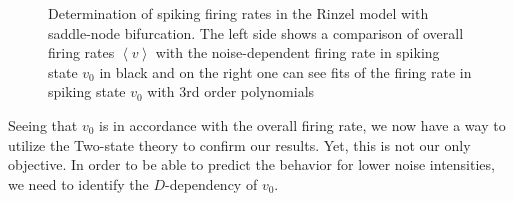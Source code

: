 \documentclass[12pt,a4paper]{article}
\begin{document}
\begin{figure}[H]
	\hspace*{-0.5cm}
	\caption{Determination of spiking firing rates in the Rinzel model with saddle-node bifurcation. The left side shows a comparison of overall firing rates $\left<v\right>$ with the noise-dependent firing rate in spiking state $v_0$ in black and on the right one can see fits of the firing rate in spiking state $v_0$ with 3rd order polynomials}
\end{figure} 
Seeing that $v_0$ is in accordance with the overall firing rate, we now have a way to utilize the Two-state theory to confirm our results. Yet, this is not our only objective. In order to be able to predict the behavior for lower noise intensities, we need to identify the $D$-dependency of $v_0$.
\end{document}

